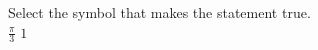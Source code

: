 \documentclass{ximera}
\author{David Kish}
\begin{document}
\begin{exercise}
Select the symbol that makes the statement true.\\
$\frac{\pi}{3}$ \wordChoice{\choice{$<$}\choice[correct]{$>$}\choice{$=$}} $1$ 

\end{exercise}
\end{document}
